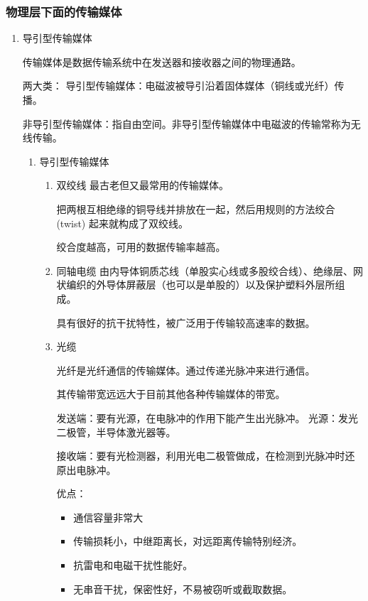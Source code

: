 \documentclass[11pt]{article}
\begin{document}
\subsubsection{物理层下面的传输媒体}
\label{sec:org8ac2324}

\begin{enumerate}
\item 导引型传输媒体
\label{sec:org6d8871b}

传输媒体是数据传输系统中在发送器和接收器之间的物理通路。

两大类：
  导引型传输媒体：电磁波被导引沿着固体媒体（铜线或光纤）传播。

非导引型传输媒体：指自由空间。非导引型传输媒体中电磁波的传输常称为无线传输。

\begin{enumerate}
\item 导引型传输媒体
\label{sec:org20e01d9}
\begin{enumerate}
\item 双绞线
最古老但又最常用的传输媒体。

把两根互相绝缘的铜导线并排放在一起，然后用规则的方法绞合 (twist) 起来就构成了双绞线。

绞合度越高，可用的数据传输率越高。

\item 同轴电缆
由内导体铜质芯线（单股实心线或多股绞合线）、绝缘层、网状编织的外导体屏蔽层（也可以是单股的）以及保护塑料外层所组成。

具有很好的抗干扰特性，被广泛用于传输较高速率的数据。

\item 光缆

光纤是光纤通信的传输媒体。通过传递光脉冲来进行通信。

其传输带宽远远大于目前其他各种传输媒体的带宽。

发送端：要有光源，在电脉冲的作用下能产生出光脉冲。
  光源：发光二极管，半导体激光器等。

接收端：要有光检测器，利用光电二极管做成，在检测到光脉冲时还原出电脉冲。

优点：
\begin{itemize}
\item 通信容量非常大

\item 传输损耗小，中继距离长，对远距离传输特别经济。

\item 抗雷电和电磁干扰性能好。

\item 无串音干扰，保密性好，不易被窃听或截取数据。


\end{itemize}
\end{enumerate}
\end{enumerate}
\end{enumerate}
\end{document}
